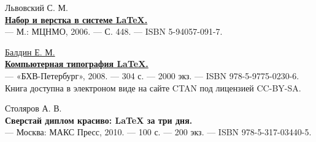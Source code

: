 \begin{thebibliography}{99}
Львовский С. М.\\
\href{http://www.mccme.ru/free-books/llang/newllang.pdf}{\textbf{Набор и верстка в системе LaTeX.}}\\
— М.: МЦНМО, 2006. — С. 448. — ISBN 5-94057-091-7.

\href{http://www.inp.nsk.su/~baldin/LaTeX/}{Балдин Е. М.}\\
\href{http://mirrors.ctan.org/info/russian/Computer_Typesetting_Using_LaTeX/ctex.pdf}{\textbf{Компьютерная типография LaTeX.}}\\
 — «БХВ-Петербург», 2008. — 304 с. — 2000 экз. — ISBN 978-5-9775-0230-6. Книга доступна в электроном виде на сайте CTAN под лицензией CC-BY-SA.

Столяров А. В.\\
\textbf{Сверстай диплом красиво: LaTeX за три дня.}\\
 — Москва: МАКС Пресс, 2010. — 100 с. — 200 экз. — ISBN 978-5-317-03440-5.

\end{thebibliography}